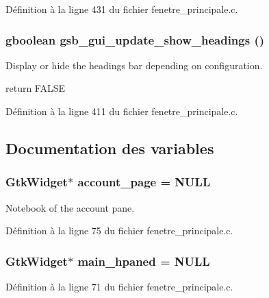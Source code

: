 Définition à la ligne 431 du fichier fenetre\_\-principale.c.

\subsubsection[{gsb\_\-gui\_\-update\_\-show\_\-headings}]{\setlength{\rightskip}{0pt plus 5cm}gboolean gsb\_\-gui\_\-update\_\-show\_\-headings ()}\label{fenetre__principale_8c_a1ea5e5d9534b171d1062af58ac8c6f3b}
Display or hide the headings bar depending on configuration.

return FALSE 

Définition à la ligne 411 du fichier fenetre\_\-principale.c.



\subsection{Documentation des variables}
\subsubsection[{account\_\-page}]{\setlength{\rightskip}{0pt plus 5cm}GtkWidget$\ast$ {\bf account\_\-page} = NULL}\label{fenetre__principale_8c_ad5443d986a9ab5d64dd84c5346c4b87c}
Notebook of the account pane. 

Définition à la ligne 75 du fichier fenetre\_\-principale.c.

\subsubsection[{main\_\-hpaned}]{\setlength{\rightskip}{0pt plus 5cm}GtkWidget$\ast$ {\bf main\_\-hpaned} = NULL}\label{fenetre__principale_8c_a4a46e75f5e42baf4abffc03a92ec3030}


Définition à la ligne 71 du fichier fenetre\_\-principale.c.

